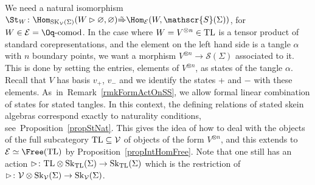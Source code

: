 We need a natural isomorphism $\St_W\colon \Hom_{{\rm SK}_\mathcal{V}(\Sigma)}(W \rhd \varnothing,\varnothing) \tilde{\Rightarrow} \Hom_{\mathcal{E}}(W, \mathscr{S}(\Sigma))$, for $W \in \mathcal{E} = \Oq\text{-}{\rm comod}$. In the case where $W = V^{\otimes n}\in {\rm TL}$ is a tensor product of standard corepresentations, and the element on the left hand side is a tangle $\alpha$ with $n$ boundary points, we want a morphism $V^{\otimes n}\to \mathscr{S}(\Sigma)$ associated to it. This is done by setting the entries, elements of $V^{\otimes n}$, as states of the tangle $\alpha$. Recall that $V$ has basis $v_+$, $v_-$ and we identify the states + and $-$ with these elements. As~in~Remark~\ref{rmkFormActOnSS}, we allow formal linear combination of states for stated tangles. In this context, the defining relations of stated skein algebras correspond exactly to naturality conditions, see~Proposition~\ref{propStNat}.
This gives the idea of how to deal with the objects of the full subcategory ${\rm TL} \subseteq \mathcal{V}$ of objects of the form $V^{\otimes n}$, and this extends to $\mathcal{E} \simeq \Free({\rm TL})$ by Proposition~\ref{propIntHomFree}. Note that one still has an action $\rhd \colon {\rm TL} \otimes {\rm Sk}_{{\rm TL}}(\Sigma) \to {\rm Sk}_{{\rm TL}}(\Sigma)$ which is the restriction of $\rhd \colon \mathcal{V} \otimes {\rm Sk}_\mathcal{V}(\Sigma) \to {\rm Sk}_\mathcal{V}(\Sigma)$.
